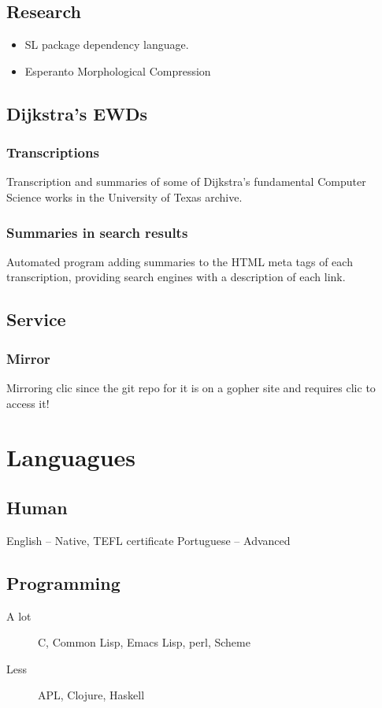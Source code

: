\subsection{Research}
\begin{itemize}[\\]
    \item{SL package dependency language.}
    \item{Esperanto Morphological Compression}
\end{itemize}

\subsection{Dijkstra's EWDs}
\subsubsection{Transcriptions}
Transcription and summaries of some of Dijkstra's fundamental Computer Science works in the University of Texas archive.
\subsubsection{Summaries in search results}
Automated program adding summaries to the HTML meta tags of each transcription, providing search engines with a description of each link.
\subsection{Service}
\subsubsection{Mirror} Mirroring clic since the git repo for it is on a gopher site and requires clic to access it!

\section{Languagues}
\subsection{Human}
English -- Native, TEFL certificate
Portuguese -- Advanced
\subsection{Programming}
\begin{description}
    \item[A lot] C, Common Lisp, Emacs Lisp, perl, Scheme
    \item[Less] APL, Clojure, Haskell
\end{description}
